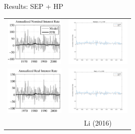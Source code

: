 \documentclass{beamer}
\begin{document}
\begin{frame}{Results: SEP + HP}
\begin{center}
\begin{tabular}{cc}
\includegraphics[height=90px]{figs/implied_ffr/nominal_2_collard.png} &
\includegraphics[height=90px]{figs/implied_ffr/nominal_2.png} \\
\includegraphics[height=90px]{figs/implied_ffr/real_2_collard.png} &
\includegraphics[height=90px]{figs/implied_ffr/real_2.png} \\
\cite{collard11} & Li (2016)
\end{tabular}
\end{center}
\end{frame}
\end{document}
